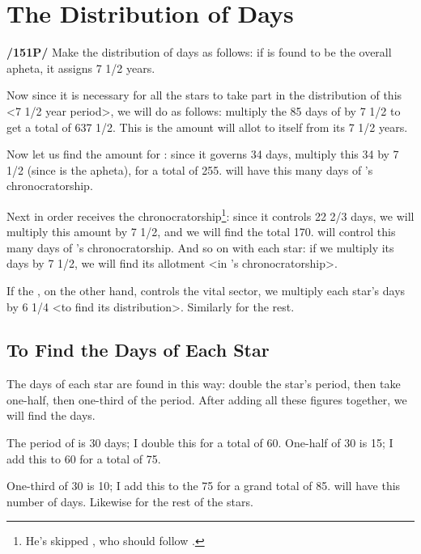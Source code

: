 \section{The Distribution of Days}
\textbf{/151P/} Make the distribution of days as follows: if \Saturn\xspace is found to be the overall apheta, it assigns 7 1/2 years.

Now since it is necessary for all the stars to take part in the distribution of this <7 1/2 year period>, we will do as follows: multiply the 85 days of \Saturn\xspace by 7 1/2 to get a total of 637 1/2. This is the amount \Saturn\xspace will allot to itself from its 7 1/2 years. 

Now let us find the amount for \Jupiter: since it governs 34 days, multiply this 34 by 7 1/2 (since \Saturn\xspace is the apheta), for a total of 255. \Jupiter\xspace will have this many days of \Saturn’s chronocratorship. 

Next in order \Venus\xspace receives the chronocratorship\footnote{He's skipped \Mars, who should follow \Jupiter.}: since
it controls 22 2/3 days, we will multiply this amount by 7 1/2, and we will find the total 170. \Venus\xspace will control this many days of \Saturn’s chronocratorship. And so on with each star: if we multiply its days by 7 1/2, we will find its allotment <in \Saturn’s chronocratorship>. 

If the \Moon, on the other hand, controls the vital sector, we multiply each star’s days by 6 1/4 <to find its distribution>. Similarly for the rest.

\subsection{To Find the Days of Each Star}

The days of each star are found in this way: double the star’s period, then take one-half, then one-third of the period. 
After adding all these figures together, we will find the days. 

The period of \Saturn\xspace is 30 days; I double this for a total of 60. One-half of 30 is 15; I add this to 60 for a total of 75. 

One-third of 30 is 10; I add this to the 75 for a grand total of 85. \Saturn\xspace will have this number of days. Likewise for the rest of the stars.

\newpage